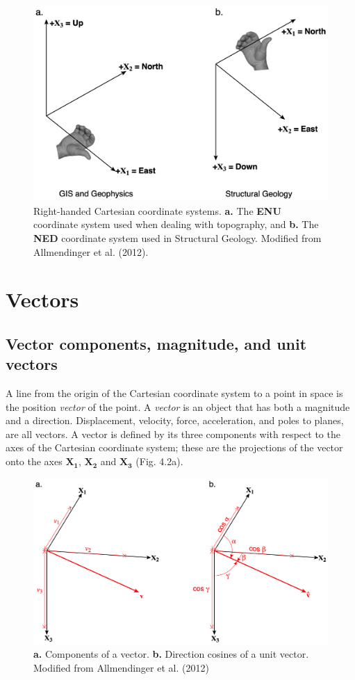 \documentclass[a4paper , 12pt]{book}
\begin{document}
\begin{figure}[ht]
    \centering
    \includegraphics[width=13cm]{Figures/ch4f1.png}
    \caption{Right-handed Cartesian coordinate systems. \textbf{a.} The \textbf{ENU} coordinate system used when dealing with topography, and \textbf{b.} The \textbf{NED} coordinate system used in Structural Geology. Modified from Allmendinger et al. (2012).}
\end{figure}

\section{Vectors}

\subsection{Vector components, magnitude, and unit vectors}
A line from the origin of the Cartesian coordinate system to a point in space is the position \textit{vector} of the point. A \textit{vector} is an object that has both a magnitude and a direction. Displacement, velocity, force, acceleration, and poles to planes, are all vectors. A vector is defined by its three components with respect to the axes of the Cartesian coordinate system; these are the projections of the vector onto the axes $\mathbf{X_1}$, $\mathbf{X_2}$ and $\mathbf{X_3}$ (Fig. 4.2a).

\begin{figure}[ht]
    \centering
    \includegraphics[width=13cm]{Figures/ch4f2.png}
    \caption{\textbf{a.} Components of a vector. \textbf{b.} Direction cosines of a unit vector. Modified from Allmendinger et al. (2012)}
\end{figure}
\end{document}
